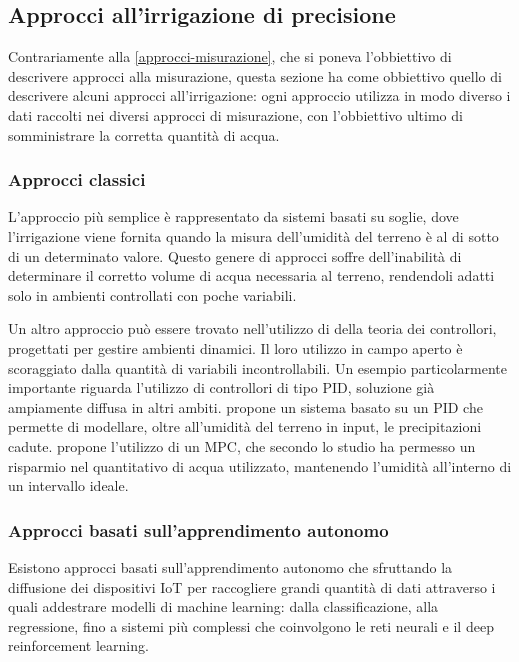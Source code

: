 \documentclass[12pt,a4paper,openright,twoside]{book}
\begin{document}
\subsection{Approcci all'irrigazione di precisione}

Contrariamente alla \cref{approcci-misurazione}, che si poneva l'obbiettivo di descrivere approcci alla misurazione, questa sezione ha come obbiettivo quello di descrivere alcuni approcci all'irrigazione: ogni approccio utilizza in modo diverso i dati raccolti nei diversi approcci di misurazione, con l'obbiettivo ultimo di somministrare la corretta quantità di acqua.

\subsubsection{Approcci classici}

L'approccio più semplice è rappresentato da sistemi basati su soglie, dove l'irrigazione viene fornita quando la misura dell'umidità del terreno è al di sotto di un determinato valore.
Questo genere di approcci soffre dell'inabilità di determinare il corretto volume di acqua necessaria al terreno, rendendoli adatti solo in ambienti controllati con poche variabili\cite{Zhao2023}.

Un altro approccio può essere trovato nell'utilizzo di della teoria dei controllori, progettati per gestire ambienti dinamici. Il loro utilizzo in campo aperto è scoraggiato dalla quantità di variabili incontrollabili.
Un esempio particolarmente importante riguarda l'utilizzo di controllori di tipo \ac{PID}, soluzione già ampiamente diffusa in altri ambiti\cite{Astrom1995}.
\cite{Goodchild2015} propone un sistema basato su un PID che permette di modellare, oltre all'umidità del terreno in input, le precipitazioni cadute. \cite{Lozoya2016} propone l'utilizzo di un \ac{MPC}, che secondo lo studio ha permesso un risparmio nel quantitativo di acqua utilizzato, mantenendo l'umidità all'interno di un intervallo ideale.

\subsubsection{Approcci basati sull'apprendimento autonomo}

Esistono approcci basati sull'apprendimento autonomo che sfruttando la diffusione dei dispositivi IoT per raccogliere grandi quantità di dati attraverso i quali addestrare modelli di machine learning: dalla classificazione\cite{Gloria2021}, alla regressione\cite{Navarro2016}, fino a sistemi più complessi che coinvolgono le reti neurali\cite{Gong2022} e il deep reinforcement learning\cite{Chen2021}.
\end{document}
